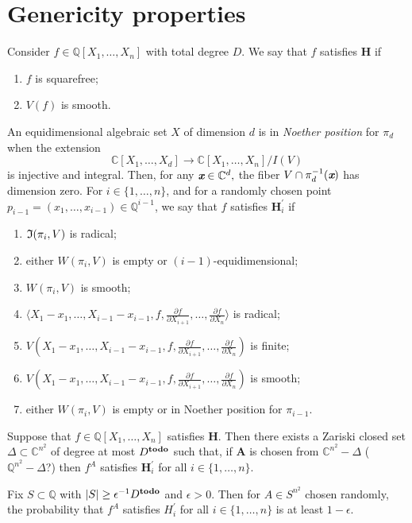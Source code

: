 \documentclass[sigconf]{acmart}
\def\td{{\bf todo}}
\def\xb{\textit{\textbf{x}}}
\def\C{\mathbb{C}}
\def\Q{\mathbb{Q}}
\def\pa{\partial}
\def\D{\Delta}
\def\I{\frak{I}}
\begin{document}
\section{Genericity properties}
%
Consider $f \in \mathbb{Q}[X_1,\hdots,X_n]$ with total degree $D$.  
We say that $f$ satisfies $\textbf{H}$ if 
%
\begin{enumerate}
    \item $f$ is squarefree;
    \item $V(f)$ is smooth.
\end{enumerate}
%
An equidimensional algebraic set $X$ of dimension $d$ is in \textit{Noether position} for $\pi_d$ when the extension 
\[
\C[X_1,\hdots,X_d] \rightarrow \C[X_1,\hdots,X_n]/I(V)
\] 
is injective and integral.  Then, for any $\xb \in \C^d,$ the fiber 
$V \cap \pi_d^{-1}(\xb)$ has dimension zero. For $i\in\{1,\hdots,n\}$, and for a randomly chosen point $p_{i-1} = (x_1,\hdots,x_{i-1}) \in \Q^{i-1}$, we say that $f$ satisfies $\textbf{H}_i^{'}$ if 
%
\begin{enumerate}
\item $\I(\pi_i,V)$ is radical;
\item either $W(\pi_i,V)$ is empty or $(i-1)$-equidimensional;
\item $W(\pi_i,V)$ is smooth;
\item $\langle X_1-x_1,\hdots,X_{i-1}-x_{i-1}, f,  \frac{\pa f}{\pa X_{i+1}},\hdots,\frac{\pa f}{\pa X_n}\rangle $ is radical; 
\item $V(X_1-x_1,\hdots,X_{i-1}-x_{i-1}, f,  \frac{\pa f}{\pa X_{i+1}},\hdots,\frac{\pa f}{\pa X_n})$ is finite;
\item $V(X_1-x_1,\hdots,X_{i-1}-x_{i-1}, f,  \frac{\pa f}{\pa X_{i+1}},\hdots,\frac{\pa f}{\pa X_n})$ is smooth;
\item either $W(\pi_i,V)$ is empty or in Noether position for $\pi_{i-1}$.
\end{enumerate}
%
\begin{theorem}
Suppose that $f \in \Q[X_1,\hdots,X_n]$ satisfies \textbf{H}. Then there exists a Zariski closed set $\D \subset \mathbb{C}^{n^2}$ of degree at most $D^{\textrm{\td}}$ such that, if $\textbf{A}$ is chosen from  $\C^{n^2}-\Delta$ ( $\Q^{n^2}-\Delta$?) then $f^A$ satisfies $\textbf{H}_i^{'}$ for all $i \in \{1,\hdots,n\}.$
\end{theorem}
%
\begin{corollary} 
Fix $S \subset \mathbb{Q}$ with $|S| \geq \epsilon^{-1} D^{\textrm{\td}}$ and $\epsilon > 0$. Then for $A\in S^{n^2}$ chosen randomly, the probability that $f^A$ satisfies $H_i^{'}$ for all $i \in \{1,\hdots,n\}$ is at least $1-\epsilon.$
\end{corollary}
%
%
%
%
\end{document}
